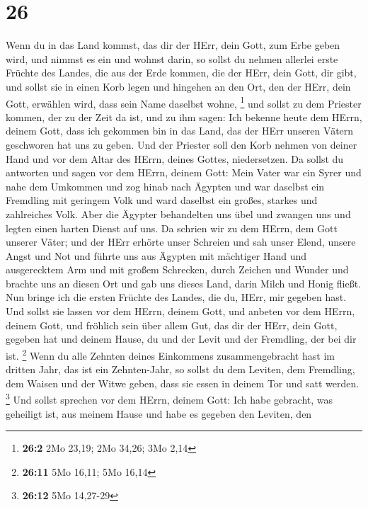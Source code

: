 \hypertarget{section-25}{%
\section{26}\label{section-25}}

 Wenn du in das Land kommst, das dir der HErr, dein Gott,
zum Erbe geben wird, und nimmst es ein und wohnst darin, 
so sollst du nehmen allerlei erste Früchte des Landes, die aus der Erde
kommen, die der HErr, dein Gott, dir gibt, und sollst sie in einen Korb
legen und hingehen an den Ort, den der HErr, dein Gott, erwählen wird,
dass sein Name daselbst wohne, \footnote{\textbf{26:2} 2Mo 23,19; 2Mo
  34,26; 3Mo 2,14}  und sollst zu dem Priester kommen, der
zu der Zeit da ist, und zu ihm sagen: Ich bekenne heute dem HErrn,
deinem Gott, dass ich gekommen bin in das Land, das der HErr unseren
Vätern geschworen hat uns zu geben.  Und der Priester soll
den Korb nehmen von deiner Hand und vor dem Altar des HErrn, deines
Gottes, niedersetzen.  Da sollst du antworten und sagen
vor dem HErrn, deinem Gott: Mein Vater war ein Syrer und nahe dem
Umkommen und zog hinab nach Ägypten und war daselbst ein Fremdling mit
geringem Volk und ward daselbst ein großes, starkes und zahlreiches
Volk.  Aber die Ägypter behandelten uns übel und zwangen
uns und legten einen harten Dienst auf uns.  Da schrien
wir zu dem HErrn, dem Gott unserer Väter; und der HErr erhörte unser
Schreien und sah unser Elend, unsere Angst und Not  und
führte uns aus Ägypten mit mächtiger Hand und ausgerecktem Arm und mit
großem Schrecken, durch Zeichen und Wunder  und brachte
uns an diesen Ort und gab uns dieses Land, darin Milch und Honig fließt.
 Nun bringe ich die ersten Früchte des Landes, die du,
HErr, mir gegeben hast. Und sollst sie lassen vor dem HErrn, deinem
Gott, und anbeten vor dem HErrn, deinem Gott,  und
fröhlich sein über allem Gut, das dir der HErr, dein Gott, gegeben hat
und deinem Hause, du und der Levit und der Fremdling, der bei dir ist.
\footnote{\textbf{26:11} 5Mo 16,11; 5Mo 16,14}  Wenn du
alle Zehnten deines Einkommens zusammengebracht hast im dritten Jahr,
das ist ein Zehnten-Jahr, so sollst du dem Leviten, dem Fremdling, dem
Waisen und der Witwe geben, dass sie essen in deinem Tor und satt
werden. \footnote{\textbf{26:12} 5Mo 14,27-29}  Und
sollst sprechen vor dem HErrn, deinem Gott: Ich habe gebracht, was
geheiligt ist, aus meinem Hause und habe es gegeben den Leviten, den
